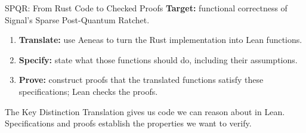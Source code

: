 \documentclass[aspectratio=169,xcolor=dvipsnames]{beamer}
\begin{document}
\begin{frame}{SPQR: From Rust Code to Checked Proofs}
    \small
    \textbf{Target:} functional correctness of Signal's Sparse Post-Quantum Ratchet.
    \begin{center}
    \end{center}

    \medskip
    \begin{enumerate}
        \item \textbf{Translate:} use Aeneas to turn the Rust implementation into Lean functions.
        \item \textbf{Specify:} state what those functions should do, including their assumptions.
        \item \textbf{Prove:} construct proofs that the translated functions satisfy these specifications; Lean checks the proofs.
    \end{enumerate}
    \medskip
    \begin{block}{The Key Distinction}
        Translation gives us code we can reason about in Lean.
        Specifications and proofs establish the properties we want to verify.
    \end{block}
\end{frame}
\end{document}
